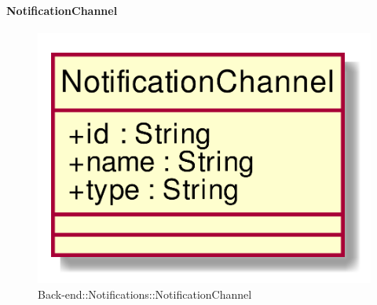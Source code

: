 \hypertarget{NotificationChannel_label}{\paragraph{NotificationChannel}}
\begin{figure}[h]
	\centering
	\includegraphics[width=\textwidth,height=\textheight,keepaspectratio]{images/ClassNotificationChannel.png}
	\caption{Back-end::Notifications::NotificationChannel}
\end{figure}
